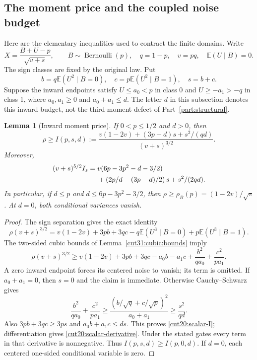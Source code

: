 \documentclass[11pt,a4paper]{article}
\numberwithin{equation}{section}
\newtheorem{lemma}[theorem]{Lemma}
\theoremstyle{definition}
\theoremstyle{remark}
\newcommand{\E}{\mathbb E}
\begin{document}
\subsection{The moment price and the coupled noise budget}
Here are the elementary inequalities used to contract the finite
domains. Write
\[
 X=\frac{B+U-p}{\sqrt{v+s}},\qquad
 B\sim\operatorname{Bernoulli}(p),\quad q=1-p,\quad v=pq,
 \quad \E(U\mid B)=0.
\]
The sign classes are fixed by the original law. Put
\[
 b=q\E(U^2\mid B=0),\quad c=p\E(U^2\mid B=1),\quad s=b+c.
\]
Suppose the inward endpoints satisfy
\(U\le a_0<p\) in class 0 and \(U\ge-a_1>-q\) in class 1,
where \(a_0,a_1\ge0\) and \(a_0+a_1\le d\).
The letter \(d\) in this subsection denotes this inward budget,
not the third-moment defect of Part~\ref{part:structural}.

\begin{lemma}[Inward moment price]\label{cut20:inward-price}
If \(0<p\le1/2\) and \(d>0\), then
\begin{equation}\label{cut20:scalar-I}
 \rho\ge I(p,s,d):=
 \frac{v(1-2v)+(3p-d)s+s^2/(qd)}{(v+s)^{3/2}}.
\end{equation}
Moreover,
\begin{align}\label{cut20:scalar-derivative}
 (v+s)^{5/2}I_s={}&v(6p-3p^2-d-3/2)\notag\\
 &+\left(2p/d-(3p-d)/2\right)s+s^2/(2qd).
\end{align}
In particular, if \(d\le p\) and \(d\le6p-3p^2-3/2\), then
\(\rho\ge\rho_B(p)=(1-2v)/\sqrt v\).
At \(d=0\), both conditional variances vanish.
\end{lemma}
\begin{proof}
The sign separation gives the exact identity
\[
 \rho(v+s)^{3/2}=v(1-2v)+3pb+3qc
       -q\E(U^3\mid B=0)+p\E(U^3\mid B=1).
\]
The two-sided cubic bounds of Lemma~\ref{cut31:cubic:bounds} imply
\[
 \rho(v+s)^{3/2}\ge v(1-2v)+3pb+3qc-a_0b-a_1c
              +\frac{b^2}{qa_0}+\frac{c^2}{pa_1}.
\]
A zero inward endpoint forces its centered noise to vanish;
its term is omitted. If \(a_0+a_1=0\), then \(s=0\) and the
claim is immediate. Otherwise Cauchy--Schwarz gives
\[
 \frac{b^2}{qa_0}+\frac{c^2}{pa_1}
 \ge\frac{(b/\sqrt q+c/\sqrt p)^2}{a_0+a_1}
 \ge\frac{s^2}{qd}.
\]
Also \(3pb+3qc\ge3ps\) and \(a_0b+a_1c\le ds\).
This proves \eqref{cut20:scalar-I}; differentiation gives
\eqref{cut20:scalar-derivative}. Under the stated gates every term
in that derivative is nonnegative. Thus \(I(p,s,d)\ge I(p,0,d)\).
If \(d=0\), each centered one-sided conditional variable is zero.
\end{proof}
\end{document}
